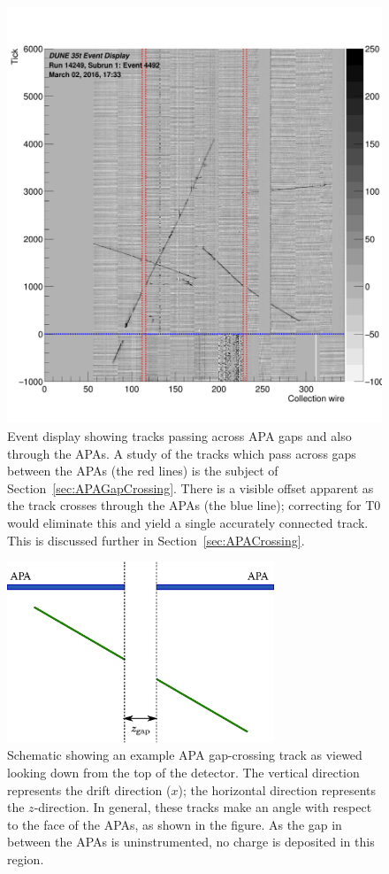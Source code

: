 \begin{figure}
  \centering
  \includegraphics[width=12cm]{evd_run14249_subrun1_event4492.png}%
  \caption[Event display showing tracks passing across APA gaps and also through the APAs.]{Event display showing tracks passing across APA gaps and also through the APAs.  A study of the tracks which pass across gaps between the APAs (the red lines) is the subject of Section~\ref{sec:APAGapCrossing}.  There is a visible offset apparent as the track crosses through the APAs (the blue line); correcting for T0 would eliminate this and yield a single accurately connected track.  This is discussed further in Section~\ref{sec:APACrossing}.}
  \label{fig:evd_crossing}
\end{figure}

\begin{figure}
  \centering
  \includegraphics[width=8cm]{apa_gap.eps}
  \caption[Schematic showing an example APA gap-crossing track as viewed looking down from the top of the detector.]{Schematic showing an example APA gap-crossing track as viewed looking down from the top of the detector.  The vertical direction represents the drift direction ($x$); the horizontal direction represents the $z$-direction.  In general, these tracks make an angle with respect to the face of the APAs, as shown in the figure.  As the gap in between the APAs is uninstrumented, no charge is deposited in this region.}
  \label{fig:APAGapCrosser}
\end{figure}

